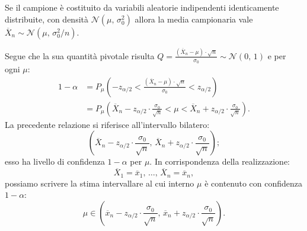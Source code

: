             \begin{prty}[Intervallo bilatero con $\mu =\,?,\, \sigma^2 = \sigma^2_0$]
                Se il campione è costituito da variabili aleatorie indipendenti identicamente distribuite, 
                con densità $\mathcal{N}(\mu,\, \sigma^2_0)$ allora la media campionaria vale 
                $\overline{X}_n\sim \mathcal{N}(\mu,\, \sigma^2_0 /n)$.

                Segue che la sua quantità pivotale risulta $Q = \frac{(\overline{X}_n -\mu)\cdot \sqrt{n}}{\sigma_0} \sim \mathcal{N}(0,\,1)$ e per ogni $\mu$:
                \begin{align*}
                    1-\alpha &= P_{\mu}\left(-z_{\alpha /2} < \frac{(\overline{X}_n -\mu)\cdot\sqrt{n}}{\sigma_0} < z_{\alpha /2}\right) \\
                             &= P_{\mu}\left(\overline{X}_n -z_{\alpha /2}\cdot \frac{\sigma_0}{\sqrt{n}} < \mu < \overline{X}_n +z_{\alpha /2}\cdot \frac{\sigma_0}{\sqrt{n}}\right)
                .\end{align*}
                La precedente relazione si riferisce all'intervallo bilatero: \[
                    \left(\overline{X}_n -z_{\alpha /2}\cdot \frac{\sigma_0}{\sqrt{n}},\, 
                    \overline{X}_n +z_{\alpha /2}\cdot \frac{\sigma_0}{\sqrt{n}}\right)
                ;\] esso ha livello di confidenza $1-\alpha$ per $\mu$.
                In corrispondenza della realizzazione: \[
                    \overline{X}_1 = \overline{x}_1,\, \ldots,\, \overline{X}_{n} = \overline{x}_n
                ,\] possiamo scrivere la stima intervallare al cui interno $\mu$ è contenuto con confidenza 
                $1-\alpha$:  \[
                    \mu \in \left(\overline{x}_n -z_{\alpha /2}\cdot \frac{\sigma_0}{\sqrt{n}},\, 
                    \overline{x}_n +z_{\alpha /2}\cdot \frac{\sigma_0}{\sqrt{n}}\right)
                .\] 
            \end{prty}

